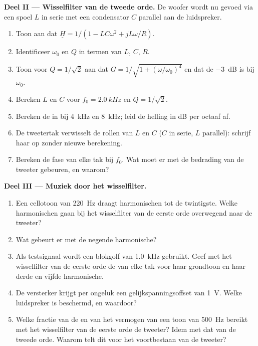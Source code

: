\begin{problem}
\medskip
\noindent\textbf{Deel II --- Wisselfilter van de tweede orde.}
De woofer wordt nu gevoed via een spoel $L$ in serie met een condensator $C$
parallel aan de luidspreker.
\begin{enumerate}[resume]
  \item Toon aan dat $\underline H = 1/(1 - LC\omega^2 + jL\omega/R)$.
  \item Identificeer $\omega_0$ en $Q$ in termen van $L$, $C$, $R$.
  \item Toon voor $Q = 1/\sqrt2$ aan dat $G = 1/\sqrt{1 + (\omega/\omega_0)^4}$
        en dat de  \qty{-3}{dB} is bij $\omega_0$.
  \item Bereken $L$ en $C$ voor $f_0 = \qty{2.0}{kHz}$ en $Q = 1/\sqrt2$.
  \item Bereken de  in  bij \qty{4}{kHz} en \qty{8}{kHz};
        leid de helling in dB per octaaf af.
  \item De tweetertak verwisselt de rollen van $L$ en $C$ ($C$ in serie,
        $L$ parallel): schrijf haar  op zonder nieuwe
        berekening.
  \item Bereken de fase van elke tak bij $f_0$. Wat moet er met de bedrading
        van de tweeter gebeuren, en waarom?
\end{enumerate}

\medskip
\noindent\textbf{Deel III --- Muziek door het wisselfilter.}
\begin{enumerate}[resume]
  \item Een cellotoon van \qty{220}{Hz} draagt harmonischen tot de twintigste.
        Welke harmonischen gaan bij het wisselfilter van de eerste orde
        overwegend naar de tweeter?
  \item Wat gebeurt er met de negende harmonische?
  \item Als testsignaal wordt een blokgolf van \qty{1.0}{kHz} gebruikt. Geef met
        het wisselfilter van de eerste orde de  van elke tak voor haar
        grondtoon en haar derde en vijfde harmonische.
  \item De versterker krijgt per ongeluk een gelijkspanningsoffset van \qty{1}{V}. Welke
        luidspreker is beschermd, en waardoor?
  \item Welke fractie van de  en van het vermogen van een toon van
        \qty{500}{Hz} bereikt met het wisselfilter van de eerste orde de tweeter?
        Idem met dat van de tweede orde. Waarom telt dit voor het
        voortbestaan van de tweeter?
\end{enumerate}


\end{problem}
